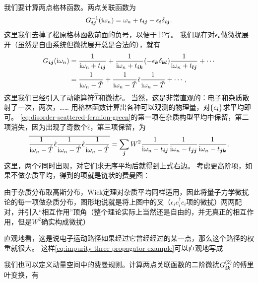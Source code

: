 我们要计算两点格林函数。两点关联函数为
\begin{equation}
    G^{-1}_{\vb*{i} \vb*{j}}(\mathrm{i} \omega_n) = \omega_n + t_{\vb*{i} \vb*{j}} - \epsilon_{\vb*{i}} \delta_{\vb*{i} \vb*{j}}.
\end{equation}
这里我们去掉了松原格林函数前面的负号，以便于书写。
我们现在对$\epsilon_{\vb*{i}}$做微扰展开（虽然是自由系统但微扰展开总是合法的），就有
\begin{equation}
    \begin{aligned}
        G_{\vb*{i} \vb*{j}}(\mathrm{i} \omega_n) &= \frac{1}{\mathrm{i} \omega_n + t_{\vb*{i} \vb*{j}}} + \frac{1}{\mathrm{i} \omega_n + t_{\vb*{i} \vb*{k}}} (- \epsilon_{\vb*{k}} \delta_{\vb*{k} \vb*{l}}) \frac{1}{\mathrm{i} \omega_n + t_{\vb*{l} \vb*{j}}} + \cdots \\
        &= \frac{1}{\mathrm{i} \omega_n - \hat{T}} + \frac{1}{\mathrm{i} \omega_n - \hat{T}} \hat{\epsilon} \frac{1}{\mathrm{i} \omega_n - \hat{T}} + \cdots,
    \end{aligned}
    \label{eq:disorder-scattered-fermion-green}
\end{equation}
这里我们已经引入了动能算符$\hat{T}$和微扰$\hat{\epsilon}$。
当然，这是非常直观的：电子和杂质散射了一次，两次，……
用格林函数计算出各种可以观测的物理量，对$\{\epsilon_{\vb*{i}}\}$求平均即可。%
\eqref{eq:disorder-scattered-fermion-green}的第一项在杂质构型平均中保留，第二项消失，因为出现了奇数个$\hat{\epsilon}$，第三项保留，为
\begin{equation}
    \overline{\frac{1}{\mathrm{i} \omega_n - \hat{T}} \hat{\epsilon} \frac{1}{\mathrm{i} \omega_n - \hat{T}} \hat{\epsilon} \frac{1}{\mathrm{i} \omega_n - \hat{T}}} = \sum_{\vb*{j}} W^2 \frac{1}{\mathrm{i} \omega_n - t_{\vb*{i} \vb*{j}}} \frac{1}{\mathrm{i} \omega_n - t_{\vb*{j} \vb*{j}}} \frac{1}{\mathrm{i} \omega_n - t_{\vb*{j} \vb*{k}} }.
    \label{eq:impurity-three-propagator-example}
\end{equation}
这里，两个$\hat{\epsilon}$同时出现，对它们求无序平均后就得到上式右边。
考虑更高阶项，如果不做杂质平均，得到的项就是链状的费曼图：

由于杂质分布取高斯分布，Wick定理对杂质平均同样适用，因此将量子力学微扰论的每一项做杂质分布，图形地说就是将上图中的叉（$\epsilon_i c^\dagger_i c_i$项的微扰）两两配对，并引入“相互作用”顶角（整个理论实际上当然还是自由的，并无真正的相互作用，但是$W^2$确实构成微扰）

直观地看，这是说电子运动路径如果经过它曾经经过的某一点，那么这个路径的权重就很大。
这样\eqref{eq:impurity-three-propagator-example}可以直观地写成

我们也可以定义动量空间中的费曼规则。计算两点关联函数的二阶微扰$G^{(2)}_{\vb*{i} \vb*{k}}$的傅里叶变换，有
